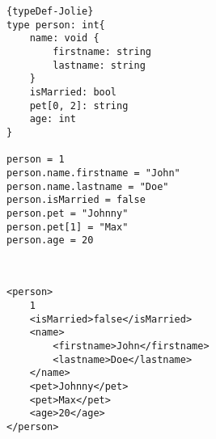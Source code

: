 
\begin{listing}
\begin{sublisting}{\linewidth}

\lstset{language=Jolie,
	style=codeStyle
}
\begin{lstlisting}[frame=tlrb]{typeDef-Jolie}
type person: int{
	name: void {
		firstname: string
		lastname: string
	}
	isMarried: bool
	pet[0, 2]: string
	age: int
}

person = 1
person.name.firstname = "John"
person.name.lastname = "Doe"
person.isMarried = false
person.pet = "Johnny"
person.pet[1] = "Max"
person.age = 20
\end{lstlisting}
\caption{Jolie code for constructing a type and value}
\end{sublisting}\\[2ex]
\begin{sublisting}{\linewidth}
\lstset{language=XML,
showspaces=false
}
\begin{lstlisting}[frame=tlrb]
<person>
	1
	<isMarried>false</isMarried>
	<name>
		<firstname>John</firstname>
		<lastname>Doe</lastname>
	</name>
	<pet>Johnny</pet>
	<pet>Max</pet>
	<age>20</age>
</person>
\end{lstlisting}
\caption{XML representation}
\end{sublisting}
\caption{ Jolie type Example }
\label{fig:TypeDefinitonUsage}
\end{listing}

\FloatBarrier